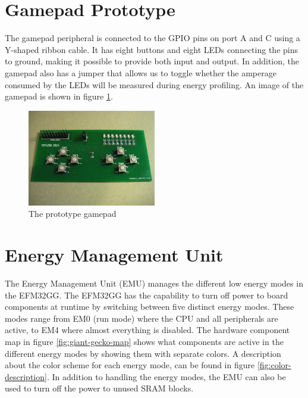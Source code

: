 \section{Gamepad Prototype}
The gamepad peripheral is connected to the GPIO pins on port A and C using a Y-shaped ribbon cable. It has eight buttons and eight LEDs connecting the pins to ground, making it possible to provide both input and output. In addition, the gamepad also has a jumper that allows us to toggle whether the amperage consumed by the LEDs will be measured during energy profiling. An image of the gamepad is shown in figure \ref{fig:gamepad}.

\begin{figure}[ht]
  \centering
  \includegraphics[width=0.5\textwidth]{images/gamepad.jpg}
  \caption{The prototype gamepad}\label{fig:gamepad}
\end{figure}


\section{Energy Management Unit}\label{sec:emu}
The Energy Management Unit (EMU) manages the different low energy modes in the EFM32GG. The EFM32GG has the capability to turn off power to board components at runtime by switching between five distinct energy modes. These modes range from EM0 (run mode) where the CPU and all peripherals are active, to EM4 where almost everything is disabled. The hardware component map in figure \ref{fig:giant-gecko-map} shows what components are active in the different energy modes by showing them with separate colors. A description about the color scheme for each energy mode, can be found in figure \ref{fig:color-description}. In addition to handling the energy modes, the EMU can also be used to turn off the power to unused SRAM blocks.\cite{efm32gg-rm}

